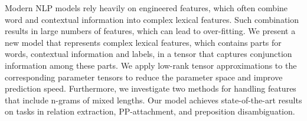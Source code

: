 Modern NLP models rely heavily on engineered features, which often combine word and contextual information into complex lexical features. Such combination results in large numbers of features, which can lead to over-fitting. We present a new model that represents complex lexical features, which contains parts for words, contextual information and labels, in a tensor that captures conjunction information among these parts. We apply low-rank tensor approximations to the corresponding parameter tensors to reduce the parameter space and improve prediction speed. Furthermore, we investigate two methods for handling features that include n-grams of mixed lengths. Our model achieves state-of-the-art results on tasks in relation extraction, PP-attachment, and preposition disambiguation.
